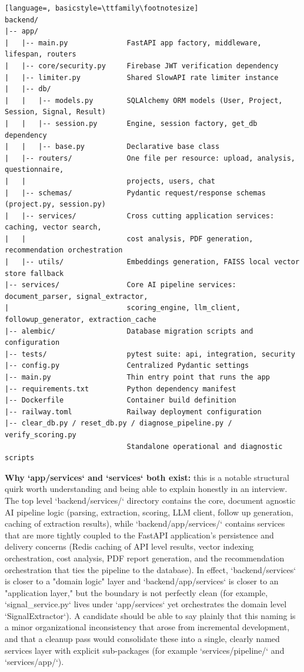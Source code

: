 \documentclass[11pt,a4paper]{report}
\begin{document}
\begin{lstlisting}[language=, basicstyle=\ttfamily\footnotesize]
backend/
|-- app/
|   |-- main.py              FastAPI app factory, middleware, lifespan, routers
|   |-- core/security.py     Firebase JWT verification dependency
|   |-- limiter.py           Shared SlowAPI rate limiter instance
|   |-- db/
|   |   |-- models.py        SQLAlchemy ORM models (User, Project, Session, Signal, Result)
|   |   |-- session.py       Engine, session factory, get_db dependency
|   |   |-- base.py          Declarative base class
|   |-- routers/             One file per resource: upload, analysis, questionnaire,
|   |                        projects, users, chat
|   |-- schemas/             Pydantic request/response schemas (project.py, session.py)
|   |-- services/            Cross cutting application services: caching, vector search,
|   |                        cost analysis, PDF generation, recommendation orchestration
|   |-- utils/               Embeddings generation, FAISS local vector store fallback
|-- services/                Core AI pipeline services: document_parser, signal_extractor,
|                            scoring_engine, llm_client, followup_generator, extraction_cache
|-- alembic/                 Database migration scripts and configuration
|-- tests/                   pytest suite: api, integration, security
|-- config.py                Centralized Pydantic settings
|-- main.py                  Thin entry point that runs the app
|-- requirements.txt         Python dependency manifest
|-- Dockerfile               Container build definition
|-- railway.toml             Railway deployment configuration
|-- clear_db.py / reset_db.py / diagnose_pipeline.py / verify_scoring.py
                             Standalone operational and diagnostic scripts
\end{lstlisting}

\textbf{Why `app/services` and `services` both exist:} this is a notable structural quirk worth understanding and being able to explain honestly in an interview. The top level `backend/services/` directory contains the core, document agnostic AI pipeline logic (parsing, extraction, scoring, LLM client, follow up generation, caching of extraction results), while `backend/app/services/` contains services that are more tightly coupled to the FastAPI application's persistence and delivery concerns (Redis caching of API level results, vector indexing orchestration, cost analysis, PDF report generation, and the recommendation orchestration that ties the pipeline to the database). In effect, `backend/services` is closer to a "domain logic" layer and `backend/app/services` is closer to an "application layer," but the boundary is not perfectly clean (for example, `signal_service.py` lives under `app/services` yet orchestrates the domain level `SignalExtractor`). A candidate should be able to say plainly that this naming is a minor organizational inconsistency that arose from incremental development, and that a cleanup pass would consolidate these into a single, clearly named services layer with explicit sub-packages (for example `services/pipeline/` and `services/app/`).
\end{document}
